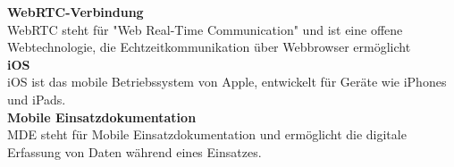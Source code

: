 
\textbf{WebRTC-Verbindung} \\
WebRTC steht für "Web Real-Time Communication" 
und ist eine offene Webtechnologie, die Echtzeitkommunikation 
über Webbrowser ermöglicht \\

\textbf{iOS} \\
iOS ist das mobile Betriebssystem von Apple, 
entwickelt für Geräte wie iPhones und iPads. \\

\textbf{Mobile Einsatzdokumentation} \\
MDE steht für Mobile Einsatzdokumentation und ermöglicht die digitale Erfassung von Daten während eines Einsatzes.